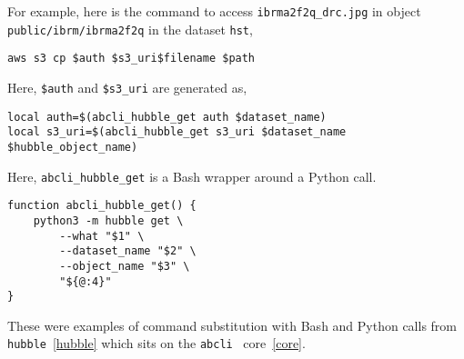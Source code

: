 For example, here is the command to access \texttt{ibrma2f2q\_drc.jpg} in object \texttt{public/ibrm/ibrma2f2q} in the dataset \texttt{hst},
%
\begin{verbatim}
aws s3 cp $auth $s3_uri$filename $path
\end{verbatim}
%
Here, \texttt{\$auth} and \texttt{\$s3\_uri} are generated as,
%
\begin{verbatim}
local auth=$(abcli_hubble_get auth $dataset_name)
local s3_uri=$(abcli_hubble_get s3_uri $dataset_name $hubble_object_name)
\end{verbatim}
%
Here, \texttt{abcli\_hubble\_get} is a Bash wrapper around a Python call.
%
\begin{verbatim}
function abcli_hubble_get() {
    python3 -m hubble get \
        --what "$1" \
        --dataset_name "$2" \
        --object_name "$3" \
        "${@:4}"
}
\end{verbatim}
%
These were examples of command substitution with Bash and Python calls from \texttt{hubble}~\ref{hubble} which sits on the  \texttt{abcli}~ core~\ref{core}.




